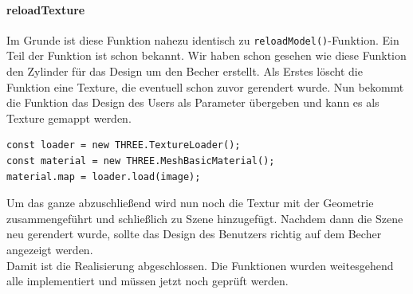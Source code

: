 \paragraph{reloadTexture}
Im Grunde ist diese Funktion nahezu identisch zu \texttt{reloadModel()}-Funktion. Ein Teil der Funktion ist schon bekannt. Wir haben schon gesehen wie diese Funktion den Zylinder für das Design um den Becher erstellt. Als Erstes löscht die Funktion eine Texture, die eventuell schon zuvor gerendert wurde. Nun bekommt die Funktion das Design des Users als Parameter übergeben und kann es als Texture gemappt werden.
%
\begin{lstlisting}[caption={TextureLoader Umsetzung},label=lst:texture]
const loader = new THREE.TextureLoader();
const material = new THREE.MeshBasicMaterial();
material.map = loader.load(image);
\end{lstlisting}
%
Um das ganze abzuschließend wird nun noch die Textur mit der Geometrie zusammengeführt und schließlich zu Szene hinzugefügt. Nachdem dann die Szene neu gerendert wurde, sollte das Design des Benutzers richtig auf dem Becher angezeigt werden.\\

Damit ist die Realisierung abgeschlossen. Die Funktionen wurden weitesgehend alle implementiert und müssen jetzt noch geprüft werden.